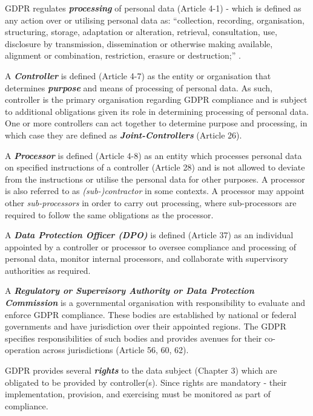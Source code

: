 GDPR regulates \textit{\textbf{processing}} of personal data (Article 4-1) - which is defined as any action over or utilising personal data as: ``collection, recording, organisation, structuring, storage, adaptation or alteration, retrieval, consultation, use, disclosure by transmission, dissemination or otherwise making available, alignment or combination, restriction, erasure or destruction;'' \cite{Regulation_GDPR}.

A \textit{\textbf{Controller}} is defined (Article 4-7) as the entity or organisation that determines \textit{\textbf{purpose}} and means of processing of personal data. As such, controller is the primary organisation regarding GDPR compliance and is subject to additional obligations given its role in determining processing of personal data. One or more controllers can act together to determine purpose and processing, in which case they are defined as \textit{\textbf{Joint-Controllers}} (Article 26).

A \textit{\textbf{Processor}} is defined (Article 4-8) as an entity which processes personal data on specified instructions of a controller (Article 28) and is not allowed to deviate from the instructions or utilise the personal data for other purposes. A processor is also referred to as \textit{(sub-)contractor} in some contexts. A processor may appoint other \textit{sub-processors} in order to carry out processing, where sub-processors are required to follow the same obligations as the processor.

A \textit{\textbf{Data Protection Officer (DPO)}} is defined (Article 37) as an individual appointed by a controller or processor to oversee compliance and processing of personal data, monitor internal processors, and collaborate with supervisory authorities as required.

A \textit{\textbf{Regulatory or Supervisory Authority or Data Protection Commission}} is a governmental organisation with responsibility to evaluate and enforce GDPR compliance. These bodies are established by national or federal governments and have jurisdiction over their appointed regions. The GDPR specifies responsibilities of such bodies and provides avenues for their co-operation across jurisdictions (Article 56, 60, 62).

GDPR provides several \textbf{\textit{rights}} to the data subject (Chapter 3) which are obligated to be provided by controller(s). Since rights are mandatory - their implementation, provision, and exercising must be monitored as part of compliance.

